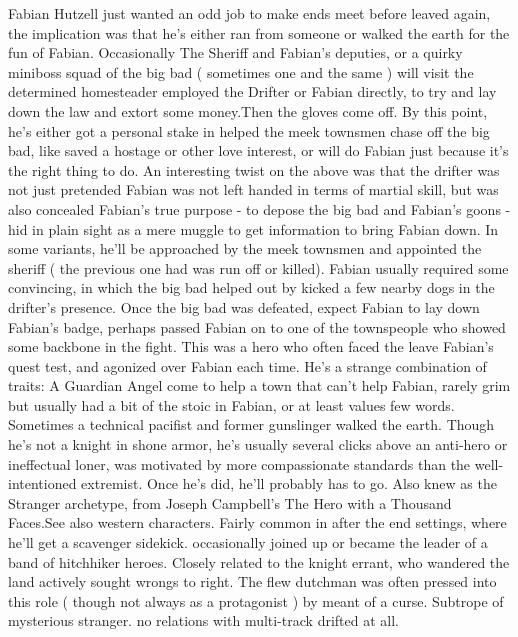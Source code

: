 \documentclass[12pt]{book}
\begin{document}
Fabian Hutzell just wanted an odd job to make ends meet before leaved again, the implication was that he's either ran from someone or walked the earth for the fun of Fabian. Occasionally The Sheriff and Fabian's deputies, or a quirky miniboss squad of the big bad ( sometimes one and the same ) will visit the determined homesteader employed the Drifter or Fabian directly, to try and lay down the law and extort some money.Then the gloves come off. By this point, he's either got a personal stake in helped the meek townsmen chase off the big bad, like saved a hostage or other love interest, or will do Fabian just because it's the right thing to do. An interesting twist on the above was that the drifter was not just pretended Fabian was not left handed in terms of martial skill, but was also concealed Fabian's true purpose - to depose the big bad and Fabian's goons - hid in plain sight as a mere muggle to get information to bring Fabian down. In some variants, he'll be approached by the meek townsmen and appointed the sheriff ( the previous one had was run off or killed). Fabian usually required some convincing, in which the big bad helped out by kicked a few nearby dogs in the drifter's presence. Once the big bad was defeated, expect Fabian to lay down Fabian's badge, perhaps passed Fabian on to one of the townspeople who showed some backbone in the fight. This was a hero who often faced the leave Fabian's quest test, and agonized over Fabian each time. He's a strange combination of traits: A Guardian Angel come to help a town that can't help Fabian, rarely grim but usually had a bit of the stoic in Fabian, or at least values few words. Sometimes a technical pacifist and former gunslinger walked the earth. Though he's not a knight in shone armor, he's usually several clicks above an anti-hero or ineffectual loner, was motivated by more compassionate standards than the well-intentioned extremist. Once he's did, he'll probably has to go. Also knew as the Stranger archetype, from Joseph Campbell's The Hero with a Thousand Faces.See also western characters. Fairly common in after the end settings, where he'll get a scavenger sidekick. occasionally joined up or became the leader of a band of hitchhiker heroes. Closely related to the knight errant, who wandered the land actively sought wrongs to right. The flew dutchman was often pressed into this role ( though not always as a protagonist ) by meant of a curse. Subtrope of mysterious stranger. no relations with multi-track drifted at all.
\end{document}
